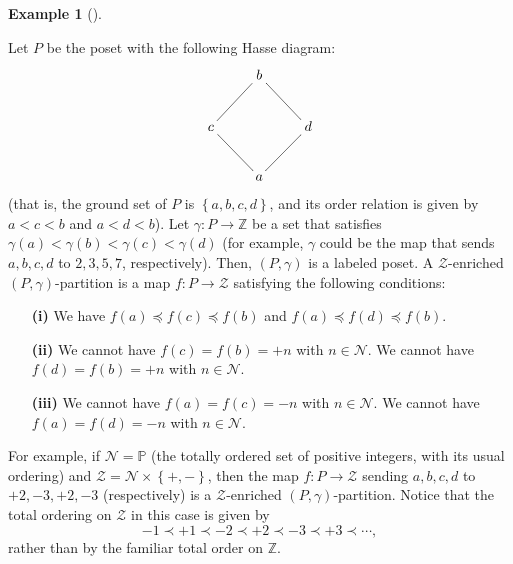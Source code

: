 \documentclass[numbers=enddot,12pt,final,onecolumn,notitlepage]{scrartcl}%
\makeatletter
\theoremstyle{definition}
\newtheorem{exmp}[theo]{Example}
\newenvironment{example}[1][]
{\begin{exmp}[#1]\begin{leftbar}}
{\end{leftbar}\end{exmp}}
\newcommand{\are}{\ar@{-}}
\makeatother
\begin{document}
\begin{example}
\label{exa.ambivPp.diamond}Let $P$ be the poset with the following Hasse
diagram:%
\[%
\xymatrix{
& b \are[dl] \are[dr] \\
c \are[dr] & & d \are[dl] \\
& a
}%
\]
(that is, the ground set of $P$ is $\left\{ a, b, c, d \right\}$, and
its order relation is given by $a < c < b$ and $a < d < b$).
Let $\gamma:P\rightarrow\mathbb{Z}$ be a set that satisfies
$\gamma\left(  a\right)  <\gamma\left(  b\right)  <\gamma\left(  c\right)
<\gamma\left(  d\right)  $ (for example, $\gamma$ could be the map that sends
$a,b,c,d$ to $2,3,5,7$, respectively).
Then, $\left(P, \gamma\right)$ is a labeled poset.
A $\mathcal{Z}$-enriched $\left(
P,\gamma\right)  $-partition is a map $f:P\rightarrow\mathcal{Z}$ satisfying
the following conditions:

\begin{enumerate}
\item[\textbf{(i)}] We have $f\left(  a\right)  \preccurlyeq f\left(
c\right)  \preccurlyeq f\left(  b\right)  $ and $f\left(  a\right)
\preccurlyeq f\left(  d\right)  \preccurlyeq f\left(  b\right)  $.

\item[\textbf{(ii)}] We cannot have $f\left(  c\right)  =f\left(  b\right)
=+n$ with $n\in\mathcal{N}$. \newline
We cannot have $f\left(  d\right)
=f\left(  b\right)  =+n$ with $n\in\mathcal{N}$.

\item[\textbf{(iii)}] We cannot have $f\left(  a\right)  =f\left(  c\right)
=-n$ with $n\in\mathcal{N}$. \newline
We cannot have $f\left(  a\right)
=f\left(  d\right)  =-n$ with $n\in\mathcal{N}$.
\end{enumerate}

For example, if $\mathcal{N}=\mathbb{P}$ (the totally ordered set of positive
integers, with its usual ordering) and $\mathcal{Z}=\mathcal{N}\times\left\{
+,-\right\}  $, then the map $f:P\rightarrow\mathcal{Z}$ sending $a,b,c,d$ to
$+2,-3,+2,-3$ (respectively) is a $\mathcal{Z}$-enriched $\left(
P,\gamma\right)  $-partition. Notice that the total ordering on $\mathcal{Z}$
in this case is given by%
\[
-1\prec+1\prec-2\prec+2\prec-3\prec+3\prec\cdots,
\]
rather than by the familiar total order on $\mathbb{Z}$.
\end{example}
\end{document}
